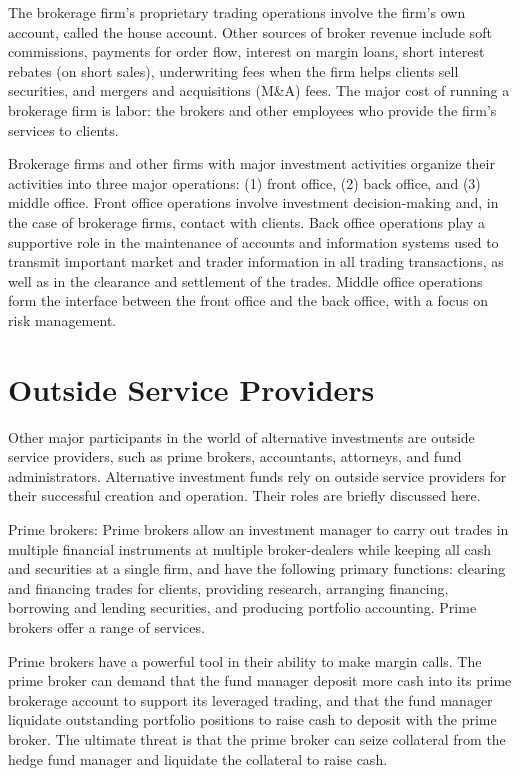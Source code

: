 \documentclass[11pt]{article}
\begin{document}
The brokerage firm's proprietary trading operations involve the firm's own account, called the house account. Other sources of broker revenue include soft commissions, payments for order flow, interest on margin loans, short interest rebates (on short sales), underwriting fees when the firm helps clients sell securities, and mergers and acquisitions (M\&A) fees. The major cost of running a brokerage firm is labor: the brokers and other employees who provide the firm's services to clients.

Brokerage firms and other firms with major investment activities organize their activities into three major operations: (1) front office, (2) back office, and (3) middle office. Front office operations involve investment decision-making and, in the case of brokerage firms, contact with clients. Back office operations play a supportive role in the maintenance of accounts and information systems used to transmit important market and trader information in all trading transactions, as well as in the clearance and settlement of the trades. Middle office operations form the interface between the front office and the back office, with a focus on risk management.

\section*{Outside Service Providers}
Other major participants in the world of alternative investments are outside service providers, such as prime brokers, accountants, attorneys, and fund administrators. Alternative investment funds rely on outside service providers for their successful creation and operation. Their roles are briefly discussed here.

Prime brokers: Prime brokers allow an investment manager to carry out trades in multiple financial instruments at multiple broker-dealers while keeping all cash and securities at a single firm, and have the following primary functions: clearing and financing trades for clients, providing research, arranging financing, borrowing and lending securities, and producing portfolio accounting. Prime brokers offer a range of services.

Prime brokers have a powerful tool in their ability to make margin calls. The prime broker can demand that the fund manager deposit more cash into its prime brokerage account to support its leveraged trading, and that the fund manager liquidate outstanding portfolio positions to raise cash to deposit with the prime broker. The ultimate threat is that the prime broker can seize collateral from the hedge fund manager and liquidate the collateral to raise cash.
\end{document}
